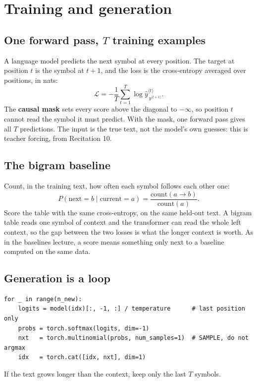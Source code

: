 \documentclass[11pt]{article}
\begin{document}
\section{Training and generation}

\subsection{One forward pass, $T$ training examples}

A language model predicts the next symbol at every position. The target at
position $t$ is the symbol at $t+1$, and the loss is the cross-entropy averaged
over positions, in nats:
\[
\mathcal{L} = -\frac{1}{T}\sum_{t=1}^{T}\log \hat{y}^{\langle t\rangle}_{\,y^{\langle t+1\rangle}}.
\]
The \textbf{causal mask} sets every score above the diagonal to $-\infty$, so
position $t$ cannot read the symbol it must predict. With the mask, one forward
pass gives all $T$ predictions. The input is the true text, not the model's own
guesses: this is teacher forcing, from Recitation 10.

\subsection{The bigram baseline}

Count, in the training text, how often each symbol follows each other one:
\[
P(\text{next}=b \mid \text{current}=a) = \frac{\text{count}(a\to b)}{\text{count}(a)}.
\]
Score the table with the same cross-entropy, on the same held-out text. A bigram
table reads one symbol of context and the transformer can read the whole left
context, so the gap between the two losses is what the longer context is worth.
As in the baselines lecture, a score means something only next to a baseline
computed on the same data.

\subsection{Generation is a loop}

\begin{lstlisting}
for _ in range(n_new):
    logits = model(idx)[:, -1, :] / temperature      # last position only
    probs = torch.softmax(logits, dim=-1)
    nxt   = torch.multinomial(probs, num_samples=1)  # SAMPLE, do not argmax
    idx   = torch.cat([idx, nxt], dim=1)
\end{lstlisting}

If the text grows longer than the context, keep only the last $T$ symbols.
\end{document}
